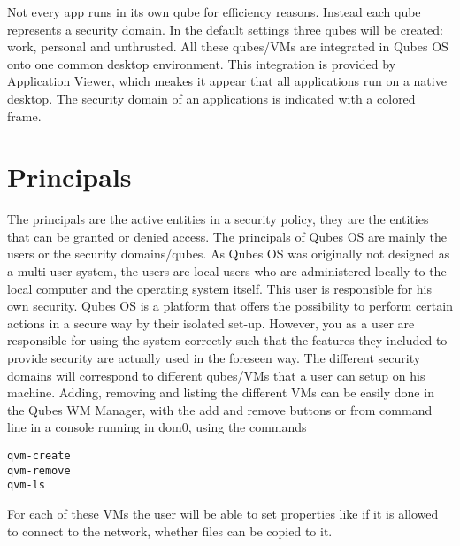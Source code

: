 \documentclass[runningheads,a4paper]{article}
\begin{document}
Not every app runs in its own qube for efficiency reasons. Instead
each qube represents a security domain. In the default settings three
qubes will be created: work, personal and unthrusted. All these
qubes/VMs are integrated in Qubes OS onto one common desktop
environment. This integration is provided by Application Viewer, which
meakes it appear that all applications run on a native desktop. The
security domain of an applications is indicated with a colored frame.

\section{Principals} 

The principals are the active entities in a security policy, they are
the entities that can be granted or denied access. The principals of
Qubes OS are mainly the users or the security domains/qubes. As Qubes OS was originally not designed
as a multi-user system, the users are local users who are administered
locally to the local computer and the operating system itself. This
user is responsible for his own security. Qubes OS is a platform that
offers the possibility to perform certain actions in a secure way by
their isolated set-up. However, you as a user are responsible for
using the system correctly such that the features they included to
provide security are actually used in the foreseen way. The different
security domains will correspond to different qubes/VMs that a user
can setup on his machine. Adding, removing and listing the different
VMs can be easily done in the Qubes WM Manager, with the add and
remove buttons or from command line in a console running in dom0,
using the commands
\begin{verbatim}
qvm-create
qvm-remove
qvm-ls
\end{verbatim}
For each of these VMs the user will be able to set properties like if
it is allowed to connect to the network, whether files can be copied
to it. 
\end{document}
